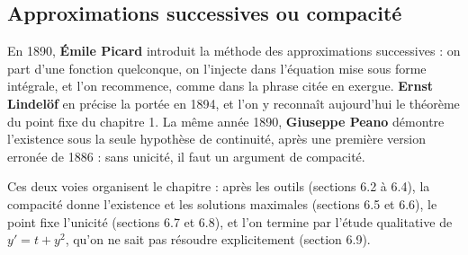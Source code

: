 \documentclass[a4paper,twoside]{report}
\begin{document}
\subsection{Approximations successives ou compacité}

En 1890, \textbf{Émile Picard} introduit la méthode des approximations successives : on part d'une fonction quelconque, on l'injecte dans l'équation mise sous forme intégrale, et l'on recommence, comme dans la phrase citée en exergue. \textbf{Ernst Lindelöf} en précise la portée en 1894, et l'on y reconnaît aujourd'hui le théorème du point fixe du chapitre 1. La même année 1890, \textbf{Giuseppe Peano} démontre l'existence sous la seule hypothèse de continuité, après une première version erronée de 1886 : sans unicité, il faut un argument de compacité.

Ces deux voies organisent le chapitre : après les outils (sections 6.2 à 6.4), la compacité donne l'existence et les solutions maximales (sections 6.5 et 6.6), le point fixe l'unicité (sections 6.7 et 6.8), et l'on termine par l'étude qualitative de $y' = t + y^{2}$, qu'on ne sait pas résoudre explicitement (section 6.9).
\end{document}
